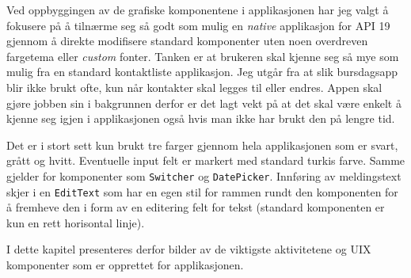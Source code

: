 Ved oppbyggingen av de grafiske komponentene i applikasjonen har jeg valgt å fokusere på å tilnærme seg så godt som mulig en \textit{native} applikasjon for API 19 gjennom å direkte modifisere standard komponenter uten noen overdreven fargetema eller \textit{custom} fonter. 
Tanken er at brukeren skal kjenne seg så mye som mulig fra en standard kontaktliste applikasjon. 
Jeg utgår fra at slik bursdagsapp blir ikke brukt ofte, kun når kontakter skal legges til eller endres. Appen skal gjøre jobben sin i bakgrunnen derfor er det lagt vekt på at det skal være enkelt å kjenne seg igjen i applikasjonen også hvis man ikke har brukt den på lengre tid. 

Det er i stort sett kun brukt tre farger gjennom hela applikasjonen som er svart, grått og hvitt. Eventuelle input felt er markert med standard turkis farve. Samme gjelder for komponenter som \texttt{Switcher} og \texttt{DatePicker}. Innføring av meldingstext skjer i en \texttt{EditText} som har en egen stil for rammen rundt den komponenten for å fremheve den i form av en editering felt for tekst (standard komponenten er kun en rett horisontal linje).

I dette kapitel presenteres derfor bilder av de viktigste aktivitetene og UIX komponenter som er opprettet for applikasjonen. 

